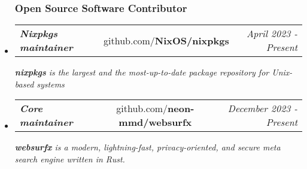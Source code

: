 \documentclass[11pt,letterpaper]{article}
\makeatletter
\newcommand{\headerrowthree}[3]{%
  \begin{tabular*}{\linewidth}{l@{\extracolsep{\fill}}c@{\extracolsep{\fill}}r}
    #1 & %
    #2 & %
    #3 \\ %
  \end{tabular*}
}
\makeatother
\begin{document}
\begin{itemize}[leftmargin=1em]

  \subsubsection*{\large Open Source Software Contributor}
    \item
          \headerrowthree
          {\textbf{\textit{Nixpkgs maintainer}}}
          {github.com/\textbf{NixOS/nixpkgs}}
          {\textit{April 2023 - Present}}
          {\emph{\textbf{nixpkgs} is the largest and the most-up-to-date package repository for Unix-based systems}}
 

    \item
          \headerrowthree
          {\textbf{\textit{Core maintainer}}}
          {github.com/\textbf{neon-mmd/websurfx}}
          {\textit{December 2023 - Present}}
          {\emph{\textbf{websurfx} is a modern, lightning-fast, privacy-oriented, and secure meta search engine written in Rust.}}


\end{itemize}
\end{document}
